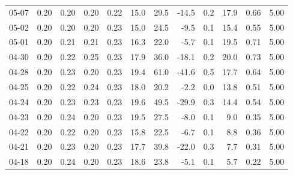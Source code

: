 \begin{threeparttable}
{\begin{tabular}{lrrrrrrrrrrr}
  05-07 &          0.20 &          0.20 &          0.20 &        0.22 &                15.0 &                29.5 &      -14.5 &                 0.2 &             17.9 &            0.66 &                   5.00 \\
  05-02 &          0.20 &          0.20 &          0.20 &        0.23 &                15.0 &                24.5 &       -9.5 &                 0.1 &             15.4 &            0.55 &                   5.00 \\
  05-01 &          0.20 &          0.21 &          0.21 &        0.23 &                16.3 &                22.0 &       -5.7 &                 0.1 &             19.5 &            0.71 &                   5.00 \\
  04-30 &          0.20 &          0.22 &          0.25 &        0.23 &                17.9 &                36.0 &      -18.1 &                 0.2 &             20.0 &            0.73 &                   5.00 \\
  04-28 &          0.20 &          0.23 &          0.20 &        0.23 &                19.4 &                61.0 &      -41.6 &                 0.5 &             17.7 &            0.64 &                   5.00 \\
  04-25 &          0.20 &          0.22 &          0.24 &        0.23 &                18.0 &                20.2 &       -2.2 &                 0.0 &             13.8 &            0.51 &                   5.00 \\
  04-24 &          0.20 &          0.23 &          0.23 &        0.23 &                19.6 &                49.5 &      -29.9 &                 0.3 &             14.4 &            0.54 &                   5.00 \\
  04-23 &          0.20 &          0.24 &          0.20 &        0.23 &                19.5 &                27.5 &       -8.0 &                 0.1 &              9.0 &            0.35 &                   5.00 \\
  04-22 &          0.20 &          0.22 &          0.20 &        0.23 &                15.8 &                22.5 &       -6.7 &                 0.1 &              8.8 &            0.36 &                   5.00 \\
  04-21 &          0.20 &          0.23 &          0.20 &        0.23 &                17.7 &                39.8 &      -22.0 &                 0.3 &              7.7 &            0.31 &                   5.00 \\
  04-18 &          0.20 &          0.24 &          0.20 &        0.23 &                18.6 &                23.8 &       -5.1 &                 0.1 &              5.7 &            0.22 &                   5.00 \\

\end{tabular}}
\end{threeparttable}
